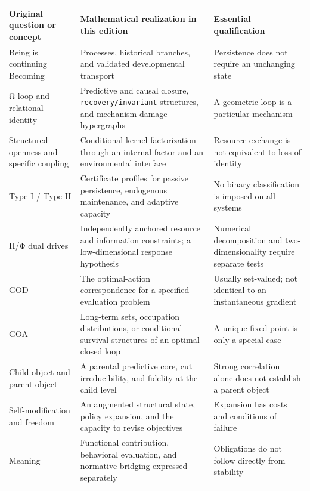 \documentclass[
  english,
  11pt,
  oneside]{book}
\newcounter{none} %
\begin{document}
{\def\LTcaptype{none} %
\begin{longtable}[]{@{}
  >{\raggedright\arraybackslash}p{}
  >{\raggedright\arraybackslash}p{}
  >{\raggedright\arraybackslash}p{}@{}}
\toprule\noalign{}
\begin{minipage}[b]{\linewidth}\raggedright
Original question or concept
\end{minipage} & \begin{minipage}[b]{\linewidth}\raggedright
Mathematical realization in this edition
\end{minipage} & \begin{minipage}[b]{\linewidth}\raggedright
Essential qualification
\end{minipage} \\
\midrule\noalign{}
\endhead
\bottomrule\noalign{}
\endlastfoot
Being is continuing Becoming & Processes, historical branches, and validated developmental transport & Persistence does not require an unchanging state \\
Ω-loop and relational identity & Predictive and causal closure, \nolinkurl{recovery/invariant} structures, and mechanism-damage hypergraphs & A geometric loop is a particular mechanism \\
Structured openness and specific coupling & Conditional-kernel factorization through an internal factor and an environmental interface & Resource exchange is not equivalent to loss of identity \\
Type I / Type II & Certificate profiles for passive persistence, endogenous maintenance, and adaptive capacity & No binary classification is imposed on all systems \\
Π/Φ dual drives & Independently anchored resource and information constraints; a low-dimensional response hypothesis & Numerical decomposition and two-dimensionality require separate tests \\
GOD & The optimal-action correspondence for a specified evaluation problem & Usually set-valued; not identical to an instantaneous gradient \\
GOA & Long-term sets, occupation distributions, or conditional-survival structures of an optimal closed loop & A unique fixed point is only a special case \\
Child object and parent object & A parental predictive core, cut irreducibility, and fidelity at the child level & Strong correlation alone does not establish a parent object \\
Self-modification and freedom & An augmented structural state, policy expansion, and the capacity to revise objectives & Expansion has costs and conditions of failure \\
Meaning & Functional contribution, behavioral evaluation, and normative bridging expressed separately & Obligations do not follow directly from stability \\
\end{longtable}
}
\end{document}

